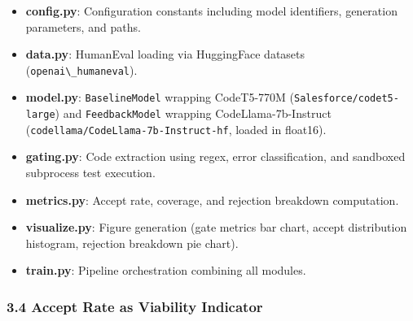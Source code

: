 \begin{itemize}
\item \textbf{config.py}: Configuration constants including model identifiers, generation parameters, and paths.
\item \textbf{data.py}: HumanEval loading via HuggingFace datasets (\texttt{openai\textbackslash \_humaneval}).
\item \textbf{model.py}: \texttt{BaselineModel} wrapping CodeT5-770M (\texttt{Salesforce/codet5-large}) and \texttt{FeedbackModel} wrapping CodeLlama-7b-Instruct (\texttt{codellama/CodeLlama-7b-Instruct-hf}, loaded in float16).
\item \textbf{gating.py}: Code extraction using regex, error classification, and sandboxed subprocess test execution.
\item \textbf{metrics.py}: Accept rate, coverage, and rejection breakdown computation.
\item \textbf{visualize.py}: Figure generation (gate metrics bar chart, accept distribution histogram, rejection breakdown pie chart).
\item \textbf{train.py}: Pipeline orchestration combining all modules.
\end{itemize}

\subsubsection{3.4 Accept Rate as Viability Indicator}

\begin{table}[htbp]
\centering
{}
\end{table}
